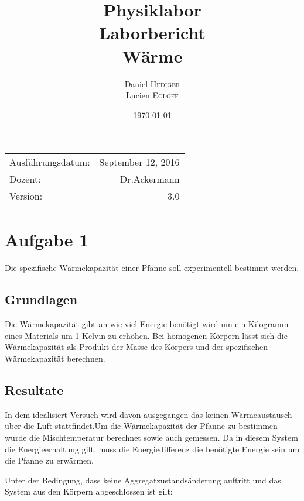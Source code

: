 \documentclass{article}
\title{Physiklabor \\ Laborbericht \\ Wärme} %
\author{Daniel \textsc{Hediger} \\ Lucien \textsc{Egloff}} %
\date{\today} %
\begin{document}
\maketitle %

\begin{center}
\begin{tabular}{l r}
Ausführungsdatum: & September 12, 2016 \\ %
Dozent: & Dr.Ackermann \\%
Version: & 3.0

\end{tabular}
\end{center}
\newpage
\tableofcontents 

\newpage
\section{Aufgabe 1}
Die spezifische Wärmekapazität einer Pfanne soll experimentell bestimmt werden.
\subsection{Grundlagen}
Die Wärmekapazität gibt an wie viel Energie benötigt wird um ein Kilogramm eines Materials um 1 Kelvin zu erhöhen.
Bei homogenen Körpern lässt sich die Wärmekapazität als Produkt der Masse des Körpers und der spezifischen Wärmekapazität berechnen.
\subsection{Resultate}
In dem idealisiert Versuch wird davon ausgegangen das keinen Wärmeaustausch über die Luft stattfindet.Um die Wärmekapazität der Pfanne zu bestimmen wurde die Mischtemperatur berechnet sowie auch gemessen. Da in diesem System die Energieerhaltung gilt, muss die Energiedifferenz die benötigte Energie sein um die Pfanne zu erwärmen.

Unter der Bedingung, dass keine Aggregatzustandsänderung auftritt und das System aus den Körpern abgeschlossen ist gilt:
\end{document}
